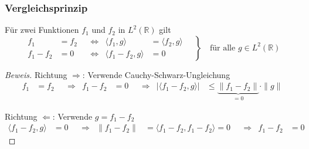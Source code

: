 %
%
\begin{frame}
\frametitle{Vergleichsprinzip}

\begin{vergleich}
Für zwei Funktionen $f_1$ und $f_2$ in $L^2(\mathbb R)$ gilt
\[
\left.
\begin{aligned}
f_1&=f_2
&&\Leftrightarrow&
\langle f_1,g\rangle &= \langle f_2,g\rangle
\\
f_1-f_2&=0
&&\Leftrightarrow&
\langle f_1-f_2,g\rangle &= 0
\end{aligned}
\quad\right\}
\quad
\text{für alle $g\in L^2(\mathbb R)$}
\]
\end{vergleich}
\vspace*{-10pt}

\begin{proof}[Beweis]
Richtung $\boxed{\Rightarrow}$\;: Verwende Cauchy-Schwarz-Ungleichung
\begin{align*}
f_1&=f_2
&&\Rightarrow&
f_1-f_2&=0
&&\Rightarrow&
|\langle f_1-f_2,g\rangle|
&\le
\underbrace{\|f_1-f_2\|}_{\displaystyle=0}\cdot \|g\|
\end{align*}
\vspace{-20pt}

Richtung $\boxed{\Leftarrow}$\;: Verwende $g=f_1-f_2$
\begin{align*}
\langle f_1-f_2,g\rangle&=0
&&\Rightarrow&
\|f_1-f_2\|
&=
\langle f_1-f_2,f_1-f_2\rangle
=
0
&&\Rightarrow&
f_1-f_2&=0
\end{align*}
\end{proof}

\end{frame}

